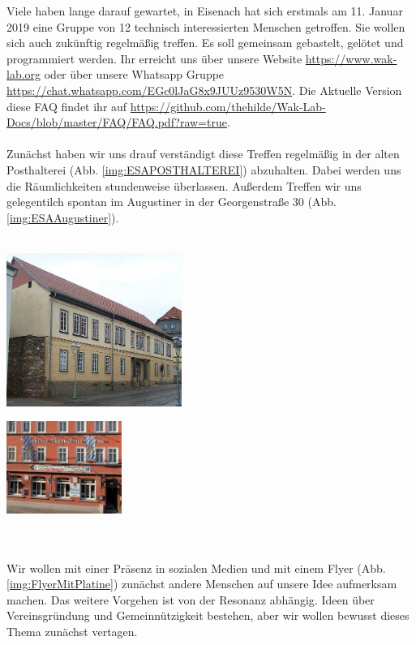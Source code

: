 Viele haben lange darauf gewartet, in Eisenach hat sich erstmals am 11. Januar  2019 eine Gruppe von 12 technisch interessierten Menschen getroffen. Sie wollen sich auch zukünftig regelmä\ss ig treffen. Es soll gemeinsam gebastelt, gelötet und programmiert werden. Ihr erreicht uns über unsere Website \url{https://www.wak-lab.org} oder über unsere Whatsapp Gruppe \url{https://chat.whatsapp.com/EGc0lJaG8x9JUUz9530W5N}. Die Aktuelle Version diese FAQ findet ihr auf \url{https://github.com/thehilde/Wak-Lab-Docs/blob/master/FAQ/FAQ.pdf?raw=true}.\\
\ \\
Zunächst haben wir uns drauf verständigt diese Treffen regelmäßig in der alten Posthalterei (Abb. \ref{img:ESAPOSTHALTEREI}) abzuhalten. Dabei werden uns die Räumlichkeiten stundenweise überlassen. Au\ss erdem Treffen wir uns gelegentilch spontan im Augustiner in der Georgenstraße 30 (Abb. \ref{img:ESAAugustiner}).\\
\ \\
\begin{minipage}[t]{0.5\textwidth}
  \centering
  \includegraphics[height=5cm]{pictures/800px-ESAPOSTHALTEREI.jpg}
  \label{img:ESAPOSTHALTEREI}
\end{minipage}
\begin{minipage}[t]{0.5\textwidth}
  \centering
  \includegraphics[height=3cm]{pictures/Augustiner.jpg}
  \label{img:ESAAugustiner}
\end{minipage}
\ \\
\ \\
Wir wollen mit einer Präsenz in sozialen Medien und mit einem Flyer (Abb. \ref{img:FlyerMitPlatine}) zunächst andere Menschen auf unsere Idee aufmerksam machen. Das weitere Vorgehen ist von der Resonanz abhängig. Ideen über Vereinsgründung und Gemeinnützigkeit bestehen, aber wir wollen bewusst dieses Thema zunächst vertagen. \\
